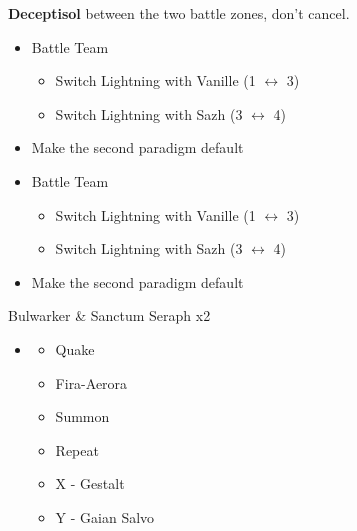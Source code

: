 \begin{paracol}{2}
\textbf{Deceptisol} between the two battle zones, don't cancel.
\switchcolumn*
\begin{menu}
	\begin{itemize}
		\paradigm
		\begin{itemize}
			\item Battle Team
			      \begin{itemize}
				      \item Switch Lightning with Vanille (1 $\leftrightarrow$ 3)
				      \item Switch Lightning with Sazh (3 $\leftrightarrow$ 4)
			      \end{itemize}
			\item Make the second paradigm default
		\end{itemize}
	\end{itemize}
\end{menu}
\switchcolumn
\begin{menu}
\begin{itemize}
    \paradigm
    \begin{itemize}
        \item Battle Team
        \begin{itemize}
            \item Switch Lightning with Vanille (1 $\leftrightarrow$ 3)
            \item Switch Lightning with Sazh (3 $\leftrightarrow$ 4)
        \end{itemize}
        \item Make the second paradigm default
    \end{itemize}
\end{itemize}
\end{menu}
\switchcolumn*
\renewcommand{\second}{[2] Relentless Assault (\rav/\rav/\com)}
\begin{battle}{Bulwarker \& Sanctum Seraph x2}
	\begin{itemize}
		\item \second
		      \begin{itemize}
			      \item Quake
			      \item Fira-Aerora
			      \item Summon
			      \item Repeat
			      \item X - Gestalt
			      \item Y - Gaian Salvo
		      \end{itemize}
	\end{itemize}

\end{battle}
\end{paracol}
